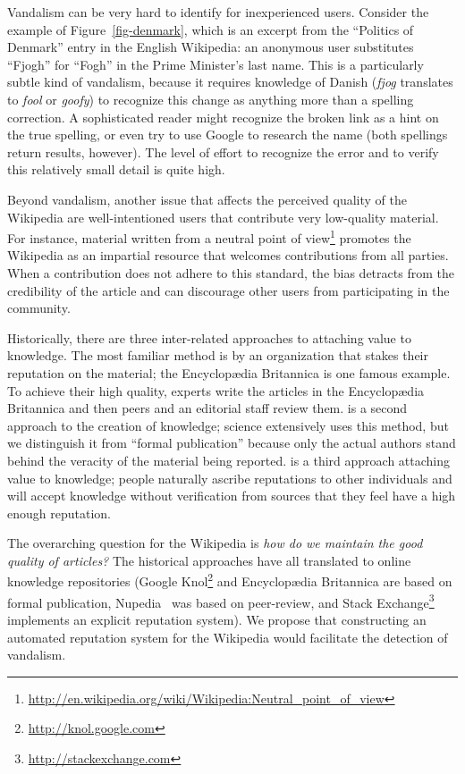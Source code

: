 Vandalism can be very hard to identify for inexperienced users.
Consider the example of Figure~\ref{fig-denmark},
which is an excerpt from the ``Politics of Denmark''
entry in the English Wikipedia: an anonymous user substitutes
``Fjogh'' for ``Fogh'' in the Prime Minister's last name.
This is a particularly subtle kind of vandalism,
because it requires knowledge of Danish
(\textit{fjog} translates to \textit{fool} or \textit{goofy})
to recognize this change as anything more than a spelling correction.
A sophisticated reader might recognize the broken link
as a hint on the true spelling, or even try to use Google
to research the name (both spellings return results, however).
The level of effort to recognize the error and to
verify this relatively small detail is quite high.

Beyond vandalism, another issue that affects the perceived
quality of the Wikipedia are well-intentioned users that contribute
very low-quality material.
For instance, material written from a
neutral point of view\footnote{\url{http://en.wikipedia.org/wiki/Wikipedia:Neutral_point_of_view}}
promotes the Wikipedia as an impartial resource that welcomes contributions
from all parties.
When a contribution does not adhere to this standard, the bias
detracts from the credibility of the article and can discourage
other users from participating in the community.

Historically, there are three inter-related approaches to
attaching value to knowledge.
The most familiar method is  by an organization
that stakes their reputation on the material;
the Encyclop{\ae}dia Britannica is one famous example.
To achieve their high quality, experts write the articles in the
Encyclop{\ae}dia Britannica
and then peers and an editorial staff review them.
 is a second approach to the creation of
knowledge; science extensively uses this method,
but we distinguish it from ``formal publication'' because
only the actual authors stand behind the veracity of the
material being reported.
 is a third approach attaching value
to knowledge; people naturally ascribe reputations to other
individuals and will accept knowledge without verification from
sources that they feel have a high enough reputation.

The overarching question for the Wikipedia is
\textit{how do we maintain the good quality of articles?}
The historical approaches have all translated to online
knowledge repositories (\eg Google Knol\footnote{\url{http://knol.google.com}}
and Encyclop{\ae}dia Britannica
are based on formal publication,
Nupedia~\cite{wiki:Nupedia}
was based on peer-review,
and Stack Exchange\footnote{\url{http://stackexchange.com}}
implements an explicit reputation system).
We propose that constructing an automated reputation system
for the Wikipedia would facilitate the detection of vandalism.

